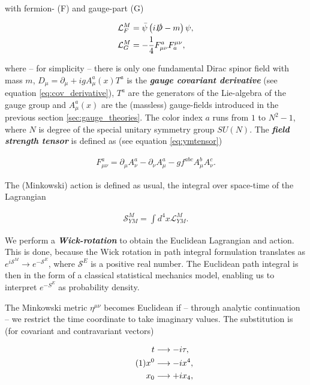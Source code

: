 \documentclass{article}
\newcommand\numberthis{\addtocounter{equation}{1}\tag{\theequation}}
\theoremstyle{plain} %
\theoremstyle{convention} %
\theoremstyle{remark} %
\def\df#1{\textbf{\textit{#1}}}
\numberwithin{equation}{section}
\begin{document}
with fermion- (F) and gauge-part (G)

\begin{align*}
    \mathcal{L}_F^M &= \bar{\psi} \left( i \slashed{D} - m \right) \psi, \\
    \mathcal{L}_G^M &= - \frac{1}{4} F_{\mu \nu}^a F_a^{\mu \nu},
\end{align*}

where -- for simplicity -- there is only one fundamental Dirac spinor field with mass $m$, $D_{\mu} = \partial_{\mu} + ig A_{\mu}^a(x) T^a$ is the \df{gauge covariant derivative} (see equation \eqref{eq:cov_derivative}), $T^a$ are the generators of the Lie-algebra of the gauge group and $A_{\mu}^a(x)$ are the (massless) gauge-fields introduced in the previous section \ref{sec:gauge_theories}. The color index $a$ runs from $1$ to $N^2-1$, where $N$ is degree of the special unitary symmetry group $SU(N)$. The \df{field strength tensor} is defined as (see equation \eqref{eq:ymtensor})

\begin{align*}
    F_{\mu \nu}^a = \partial_{\mu} A_{\nu}^a - \partial_{\nu} A_{\mu}^a - g f^{abc} A_{\mu}^b A_{\nu}^c.
\end{align*}

The (Minkowski) action is defined as usual, the integral over space-time of the Lagrangian

\begin{align*}
    \mathcal{S}_{YM}^M = \int d^4x \mathcal{L}_{YM}^M.
\end{align*}

We perform a \df{Wick-rotation} to obtain the Euclidean Lagrangian and action. This is done, because the Wick rotation in path integral formulation translates as $e^{i \mathcal{S}^M} \to e^{-\mathcal{S}^E}$, where $\mathcal{S}^E$ is a positive real number. The Euclidean path integral is then in the form of a classical statistical mechanics model, enabling us to interpret $e^{-S^E}$ as probability density.

The Minkowski metric $\eta^{\mu \nu}$ becomes Euclidean if -- through analytic continuation -- we restrict the time coordinate to take imaginary values. The substitution is (for covariant and contravariant vectors)

\begin{align*}
    t &\longrightarrow - i \tau, \\ \numberthis \label{eq:wick}
    x^0 &\longrightarrow - i x^4, \\
    x_0 &\longrightarrow + i x_4,
\end{align*}
\end{document}
